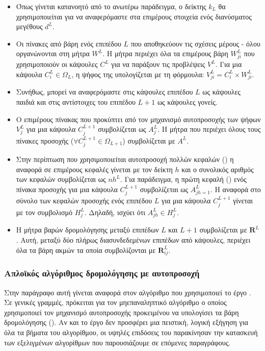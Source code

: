 \begin{itemize}
  \item Όπως γίνεται κατανοητό από το ανωτέρω παράδειγμα, ο δείκτης $k_L$ θα χρησιμοποιείται για να αναφερόμαστε στα επιμέρους στοιχεία ενός διανύσματος μεγέθους $d^L$.
  \item Οι πίνακες από βάρη ενός επιπέδου $L$ που αποθηκεύουν τις σχέσεις μέρους - όλου οργανώνονται στη μήτρα $W^L$. Η μήτρα περιέχει όλα τα επιμέρους βάρη $W_{ji}^L$ που χρησιμοποιούν οι κάψουλες $C^L$ για να παράξουν τις προβλέψεις $V^L$. Για μια κάψουλα $C_i^L \in \Omega_L$, η ψήφος της υπολογίζεται με τη φόρμουλα: $V_{ji}^L = C_i^L \times W_{ji}^L$.
  \item Συνήθως, μπορεί να αναφερόμαστε στις κάψουλες επιπέδου $L$ ως κάψουλες παιδιά και στις αντίστοιχες του επιπέδου $L+1$ ως κάψουλες γονείς.
  \item Ο επιμέρους πίνακας που προκύπτει από τον μηχανισμό αυτο\textendash προσοχής των ψήφων $V^L_j$ για μια κάψουλα $C_j^{L+1}$ συμβολίζεται ως $Α^L_j$. Η μήτρα που περιέχει όλους τους πίνακες προσοχής ($\forall C_j^{L+1} \in \Omega_{L+1}$) συμβολίζεται με $A^L$.
  \item Στην περίπτωση που χρησιμοποιείται αυτο\textendash προσοχή πολλών κεφαλών () η αναφορά σε επιμέρους κεφαλές γίνεται με τον δείκτη $h$ και ο συνολικός αριθμός των κεφαλών συμβολίζεται ως $nh^L$. Για παράδειγμα, η πρώτη κεφαλή () ενός πίνακα προσοχής για μια κάψουλα $C^{L+1}_j$ συμβολίζεται ως $A_{jh=1}^L$. Η αναφορά στο σύνολο των κεφαλών προσοχής ενός επιπέδου $L$ για μια κάψουλα $C_j^{L+1}$ γίνεται με τον συμβολισμό $H_j^L$. Δηλαδή, ισχύει ότι $A_{jh}^L \in H_j^L$.
  \item Η μήτρα βαρών δρομολόγησης μεταξύ επιπέδων $L$ και $L + 1$ συμβολίζεται με $\mathbf{R}^L$. Αυτή, μεταξύ δύο πλήρως διασυνδεδεμένων επιπέδων από κάψουλες, περιέχει όλα τα βάρη ακμών τα οποία συμβολίζονται με $\mathbf{R}_{ij}^L$.
\end{itemize}


\subsubsection{Απλοϊκός αλγόριθμος δρομολόγησης με αυτο\textendash προσοχή}

Στην παράγραφο αυτή γίνεται αναφορά στον αλγόριθμο που χρησιμοποιεί το έργο \cite{mazzia2021efficient}. Σε γενικές γραμμές, πρόκειται για τον μη\textendash επαναληπτικό αλγόριθμο ο οποίος χρησιμοποιεί τον μηχανισμό αυτο\textendash προσοχής προκειμένου να υπολογίσει τα βάρη δρομολόγησης (). Αν και το έργο δεν προσφέρει μια πειστική, λογική εξήγηση για όλα τα βήματα του αλγορίθμου, οι υψηλές επιδόσεις του παρακίνησαν την κατασκευή των εξελιγμένων αλγορίθμων που παρουσιάζουμε σε επόμενες παραγράφους.\par

